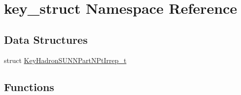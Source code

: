 \hypertarget{namespacekey__struct}{}\section{key\+\_\+struct Namespace Reference}
\label{namespacekey__struct}
\subsection*{Data Structures}
\begin{DoxyCompactItemize}
\item 
struct \mbox{\hyperlink{structkey__struct_1_1KeyHadronSUNNPartNPtIrrep__t}{Key\+Hadron\+S\+U\+N\+N\+Part\+N\+Pt\+Irrep\+\_\+t}}
\end{DoxyCompactItemize}
\subsection*{Functions}
